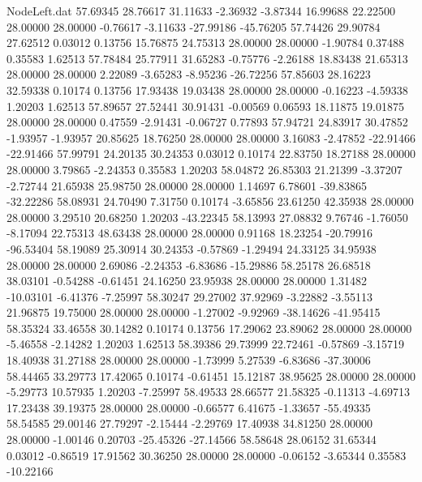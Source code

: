 \begin{filecontents}{NodeLeft.dat}
  57.69345   28.76617   31.11633    -2.36932   -3.87344   16.99688   22.22500   28.00000   28.00000   -0.76617   -3.11633  -27.99186  -45.76205
  57.74426   29.90784   27.62512     0.03012    0.13756   15.76875   24.75313   28.00000   28.00000   -1.90784    0.37488    0.35583    1.62513
  57.78484   25.77911   31.65283    -0.75776   -2.26188   18.83438   21.65313   28.00000   28.00000    2.22089   -3.65283   -8.95236  -26.72256
  57.85603   28.16223   32.59338     0.10174    0.13756   17.93438   19.03438   28.00000   28.00000   -0.16223   -4.59338    1.20203    1.62513
  57.89657   27.52441   30.91431    -0.00569    0.06593   18.11875   19.01875   28.00000   28.00000    0.47559   -2.91431   -0.06727    0.77893
  57.94721   24.83917   30.47852    -1.93957   -1.93957   20.85625   18.76250   28.00000   28.00000    3.16083   -2.47852  -22.91466  -22.91466
  57.99791   24.20135   30.24353     0.03012    0.10174   22.83750   18.27188   28.00000   28.00000    3.79865   -2.24353    0.35583    1.20203
  58.04872   26.85303   21.21399    -3.37207   -2.72744   21.65938   25.98750   28.00000   28.00000    1.14697    6.78601  -39.83865  -32.22286
  58.08931   24.70490    7.31750     0.10174   -3.65856   23.61250   42.35938   28.00000   28.00000    3.29510   20.68250    1.20203  -43.22345
  58.13993   27.08832    9.76746    -1.76050   -8.17094   22.75313   48.63438   28.00000   28.00000    0.91168   18.23254  -20.79916  -96.53404
  58.19089   25.30914   30.24353    -0.57869   -1.29494   24.33125   34.95938   28.00000   28.00000    2.69086   -2.24353   -6.83686  -15.29886
  58.25178   26.68518   38.03101    -0.54288   -0.61451   24.16250   23.95938   28.00000   28.00000    1.31482  -10.03101   -6.41376   -7.25997
  58.30247   29.27002   37.92969    -3.22882   -3.55113   21.96875   19.75000   28.00000   28.00000   -1.27002   -9.92969  -38.14626  -41.95415
  58.35324   33.46558   30.14282     0.10174    0.13756   17.29062   23.89062   28.00000   28.00000   -5.46558   -2.14282    1.20203    1.62513
  58.39386   29.73999   22.72461    -0.57869   -3.15719   18.40938   31.27188   28.00000   28.00000   -1.73999    5.27539   -6.83686  -37.30006
  58.44465   33.29773   17.42065     0.10174   -0.61451   15.12187   38.95625   28.00000   28.00000   -5.29773   10.57935    1.20203   -7.25997
  58.49533   28.66577   21.58325    -0.11313   -4.69713   17.23438   39.19375   28.00000   28.00000   -0.66577    6.41675   -1.33657  -55.49335
  58.54585   29.00146   27.79297    -2.15444   -2.29769   17.40938   34.81250   28.00000   28.00000   -1.00146    0.20703  -25.45326  -27.14566
  58.58648   28.06152   31.65344     0.03012   -0.86519   17.91562   30.36250   28.00000   28.00000   -0.06152   -3.65344    0.35583  -10.22166

\end{filecontents}
